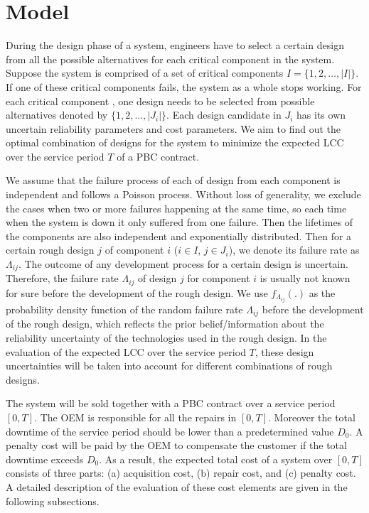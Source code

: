\documentclass[preprint,12pt]{elsarticle}
\begin{document}
\section{Model}
During the design phase of a system, engineers have to select a certain design from all the possible alternatives for each critical component in the system. Suppose the system is comprised of a set of critical components $I=\{1,2,\dots,\lvert I \rvert\}$. If one of these critical components fails, the system as a whole stops working. For each critical component , one design needs to be selected from possible alternatives denoted by $\{1,2,...,\lvert J_{i} \rvert\}$. Each design candidate in $J_{i}$ has its own uncertain reliability parameters and cost parameters. We aim to find out the optimal combination of designs for the system to minimize the expected LCC over the service period $T$ of a PBC contract.

We assume that the failure process of each of design from each component is independent and follows a Poisson process. Without loss of generality, we exclude the cases when two or more failures happening at the same time, so each time when the system is down it only suffered from one failure. Then the lifetimes of the components are also independent and exponentially distributed. Then for a certain rough design $j$ of component $i$ ($i \in I$, $j \in J_{i}$), we denote its failure rate as $\Lambda_{ij}$. The outcome of any development process for a certain design is uncertain. Therefore, the failure rate $\Lambda_{ij}$ of design $j$ for component $i$ is usually not known for sure before the development of the rough design. We use $f_{\Lambda_{ij}}(.)$ as the probability density function of the random failure rate $\Lambda_{ij}$ before the development of the rough design, which reflects the prior belief/information about the reliability uncertainty of the technologies used in the rough design. In the evaluation of the expected LCC over the service period $T$, these design uncertainties will be taken into account for different combinations of rough designs.

The system will be sold together with a PBC contract over a service period $[0,T]$. The OEM is responsible for all the repairs in $[0,T]$. Moreover the total downtime of the service period should be lower than a predetermined value $D_0$. A penalty cost will be paid by the OEM to compensate the customer if the total downtime exceeds $D_{0}$. As a result, the expected total cost of a system over $[0, T]$ consists of three parts: (a) acquisition cost, (b) repair cost, and (c) penalty cost. A detailed description of the evaluation of these cost elements are given in the following subsections.
\end{document}
